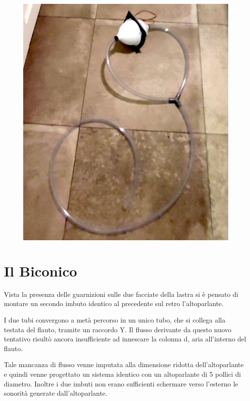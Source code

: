 \begin{figure}%
\centering
\includegraphics[width=0.99\columnwidth]{Graphics/foto/biconico}
\end{figure}

\section{Il Biconico}

Vista la presenza delle guarnizioni sulle due facciate della lastra si è pensato di montare un secondo imbuto identico al precedente sul retro l’altoparlante.

I due tubi convergono a metà percorso in un unico tubo, che si collega alla testata del flauto, tramite un raccordo Y.
Il flusso derivante da questo nuovo tentativo risultò ancora insufficiente ad innescare la colonna d, aria all’interno del flauto.

Tale mancanza di flusso venne imputata alla dimensione ridotta dell’altoparlante e quindi venne progettato un sistema identico con un altoparlante di 5 pollici di diametro.
Inoltre i due imbuti non erano sufficienti  schermare verso l’esterno le sonorità generate dall’altoparlante.


